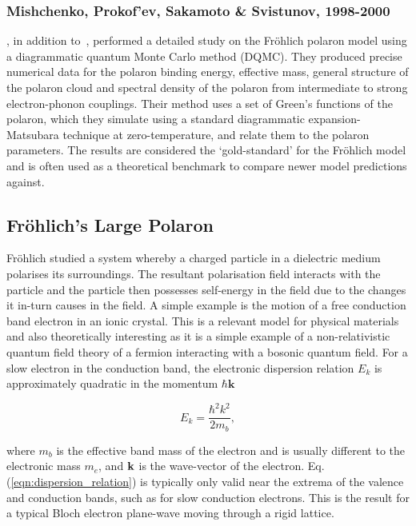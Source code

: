 \subsubsection{Mishchenko, Prokof’ev, Sakamoto \& Svistunov, 1998-2000}
\label{subsubsec:2-1-1-9}

\cite{prokofev_polaron_1998}, in addition to~\cite{mishchenko_diagrammatic_2000}, performed a detailed study on the Fr\"ohlich polaron model using a diagrammatic quantum Monte Carlo method (DQMC). They produced precise numerical data for the polaron binding energy, effective mass, general structure of the polaron cloud and spectral density of the polaron from intermediate to strong electron-phonon couplings. Their method uses a set of Green's functions of the polaron, which they simulate using a standard diagrammatic expansion-Matsubara technique at zero-temperature, and relate them to the polaron parameters. The results are considered the `gold-standard' for the Fr\"ohlich model and is often used as a theoretical benchmark to compare newer model predictions against.

\subsection{Fr\"ohlich's Large Polaron}
\label{subsec:2-1-2}

Fr\"ohlich studied a system whereby a charged particle in a dielectric medium polarises its surroundings. The resultant polarisation field interacts with the particle and the particle then possesses self-energy in the field due to the changes it in-turn causes in the field. A simple example is the motion of a free conduction band electron in an ionic crystal. This is a relevant model for physical materials and also theoretically interesting as it is a simple example of a non-relativistic quantum field theory of a fermion interacting with a bosonic quantum field. For a slow electron in the conduction band, the electronic dispersion relation $E_k$ is approximately quadratic in the momentum $\hbar \textbf{k}$ 

\begin{equation}
    E_k = \frac{\hbar^2 k^2}{2 m_b},
\label{eqn:dispersion_relation}
\end{equation}

where $m_b$ is the effective band mass of the electron and is usually different to the electronic mass $m_e$, and $\vb{k}$ is the wave-vector of the electron. Eq. (\ref{eqn:dispersion_relation}) is typically only valid near the extrema of the valence and conduction bands, such as for slow conduction electrons. This is the result for a typical Bloch electron plane-wave moving through a rigid lattice.  

